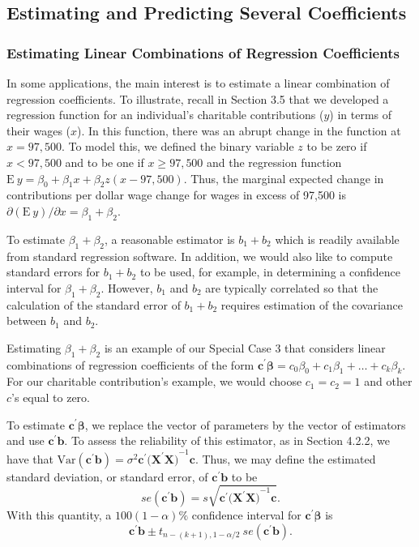 \subsection{Estimating and Predicting Several Coefficients}\label{S4:SetsInference}

\subsubsection*{Estimating Linear Combinations of Regression Coefficients}

In some applications, the main interest is to estimate a linear
combination of regression coefficients. To illustrate, recall in
Section 3.5 that we developed a regression function for an
individual's charitable contributions ($y$) in terms of their wages
($x$). In this function, there was an abrupt change in the function
at $x=97,500$. To model this, we defined the binary variable $z$ to
be zero if $x<97,500$ and to be one if $x\geq 97,500$ and the
regression function $\mathrm{E~}y=\beta_0+\beta_1x+\beta
_2z(x-97,500)$. Thus, the marginal expected change in contributions
per dollar wage change for wages in excess of 97,500 is $\partial
\left( \mathrm{E~}y\right) /\partial x=\beta_1+\beta _2$.

To estimate $\beta_1+\beta_2$, a reasonable estimator is $b_1+b_2$
which is readily available from standard regression software. In
addition, we would also like to compute standard errors for
$b_1+b_2$ to be used, for example, in determining a confidence
interval for $\beta_1+\beta_2$. However, $b_1$ and $b_2$ are
typically correlated so that the calculation of the standard error
of $b_1+b_2$ requires estimation of the covariance between $b_1$ and
$b_2$.

Estimating $\beta_1 + \beta_2$ is an example of our Special Case 3
that considers linear combinations of regression coefficients of the
form $\mathbf{c}^{\prime}  \boldsymbol \beta=c_0\beta
_0+c_1\beta_1+\ldots+c_k\beta_k$. For our charitable contribution's
example, we would choose $c_1=c_2=1$ and other $c$'s equal to zero.

To estimate $\mathbf{c}^{\prime} \boldsymbol \beta $, we replace the
vector of
parameters by the vector of estimators and use $\mathbf{c}^{\prime}\mathbf{b%
}$. To assess the reliability of this estimator, as in Section
4.2.2, we have that $\mathrm{Var}\left(
\mathbf{c}^{\prime}\mathbf{b}\right) =\sigma ^{2}
\mathbf{c}^{\prime}(\mathbf{X^{\prime}X)}^{-1}\mathbf{c}$. Thus, we
may define the estimated standard deviation, or standard error, of
$\mathbf{c} ^{\prime}\mathbf{b}$ to be
\begin{equation*}
se\left( \mathbf{c}^{\prime}\mathbf{b}\right) =s\sqrt{\mathbf{c}^{\prime}(%
\mathbf{X^{\prime}X)}^{-1}\mathbf{c}}.
\end{equation*}%
With this quantity, a $100(1-\alpha ) \%$ confidence interval for
$\mathbf{c}^{\prime} \boldsymbol \beta$ is
\begin{equation}  \label{E4:ConfIntLinCombination}
\mathbf{c}^{\prime}\mathbf{b}\pm t_{n-(k+1),1-\alpha /2} ~se(\mathbf{c}%
^{\prime}\mathbf{b}).
\end{equation}

